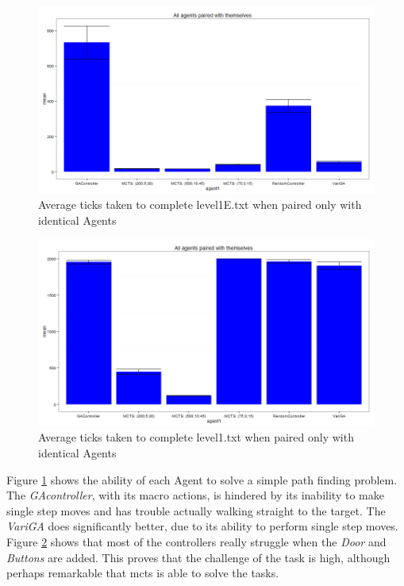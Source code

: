\documentclass{IEEEtran}
\begin{document}
\begin{figure}[ht]
\centering
\includegraphics[width=\linewidth]{level1E-txt-pairs-ticks}
\caption{Average ticks taken to complete level1E.txt when paired only with identical Agents}
\label{1epairedTicks}
\end{figure}

\begin{figure}[ht]
\centering
\includegraphics[width=\linewidth]{level1-txt-pairs-ticks}
\caption{Average ticks taken to complete level1.txt when paired only with identical Agents}
\label{1pairedTicks}
\end{figure}

Figure \ref{1epairedTicks} shows the ability of each Agent to solve a simple path finding problem. The \emph{GAcontroller}, with its macro actions, is hindered by its inability to make single step moves and has trouble actually walking straight to the target. The \emph{VariGA} does significantly better, due to its ability to perform single step moves. Figure \ref{1pairedTicks} shows that most of the controllers really struggle when the \emph{Door} and \emph{Buttons} are added. This proves that the challenge of the task is high, although perhaps remarkable that \gls{mcts} is able to solve the tasks.
\end{document}
